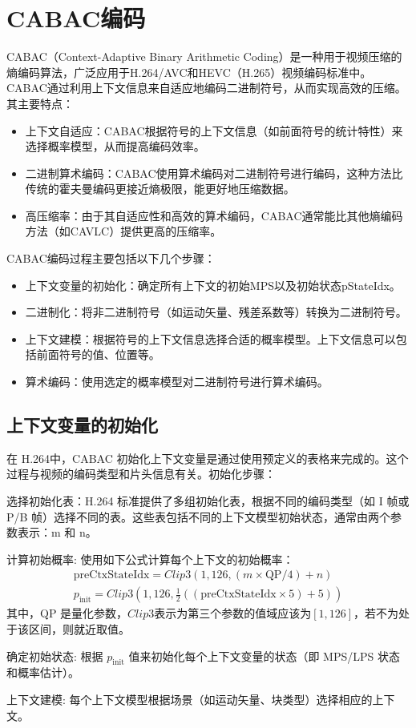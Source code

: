 \documentclass{/home/hi/Study/template/code}
\begin{document}
\section{CABAC编码}
CABAC（Context-Adaptive Binary Arithmetic Coding）是一种用于视频压缩的熵编码算法，广泛应用于H.264/AVC和HEVC（H.265）视频编码标准中。CABAC通过利用上下文信息来自适应地编码二进制符号，从而实现高效的压缩。其主要特点：
\begin{itemize}
	\item 上下文自适应：CABAC根据符号的上下文信息（如前面符号的统计特性）来选择概率模型，从而提高编码效率。
	\item 二进制算术编码：CABAC使用算术编码对二进制符号进行编码，这种方法比传统的霍夫曼编码更接近熵极限，能更好地压缩数据。
	\item 高压缩率：由于其自适应性和高效的算术编码，CABAC通常能比其他熵编码方法（如CAVLC）提供更高的压缩率。
\end{itemize}

CABAC编码过程主要包括以下几个步骤：
\begin{itemize}
	\item 上下文变量的初始化：确定所有上下文的初始MPS以及初始状态pStateIdx。
	\item 二进制化：将非二进制符号（如运动矢量、残差系数等）转换为二进制符号。
	\item 上下文建模：根据符号的上下文信息选择合适的概率模型。上下文信息可以包括前面符号的值、位置等。
	\item 算术编码：使用选定的概率模型对二进制符号进行算术编码。
\end{itemize}

\subsection{上下文变量的初始化}
在 H.264中，CABAC 初始化上下文变量是通过使用预定义的表格来完成的。这个过程与视频的编码类型和片头信息有关。初始化步骤：

\begin{serialNumber}
	\item 选择初始化表：H.264 标准提供了多组初始化表，根据不同的编码类型（如 I 帧或 P/B 帧）选择不同的表。这些表包括不同的上下文模型初始状态，通常由两个参数表示：m 和 n。
	\item 计算初始概率: 使用如下公式计算每个上下文的初始概率：
	\begin{gather}
		\text{preCtxStateIdx} = Clip3(1, 126, (m \times \text{QP} / 4) + n) \\
		p_{\text{init}} = Clip3(1, 126, \frac{1}{2}((\text{preCtxStateIdx} \times 5) + 5))
	\end{gather}
	其中，QP 是量化参数，$Clip3$表示为第三个参数的值域应该为$[1,126]$，若不为处于该区间，则就近取值。

	\item 确定初始状态: 根据 $p_{\text{init}}$ 值来初始化每个上下文变量的状态（即 MPS/LPS 状态和概率估计）。
	\item 上下文建模: 每个上下文模型根据场景（如运动矢量、块类型）选择相应的上下文。
\end{serialNumber}
\end{document}
